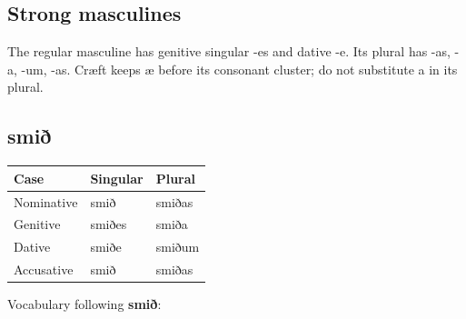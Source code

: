 \subsection*{Strong masculines}

The regular masculine has genitive singular -es and dative -e. Its plural has -as, -a, -um, -as. Cræft keeps æ before its consonant cluster; do not substitute a in its plural.

\subsection*{smið}

\par\begingroup
\fontsize{10.5}{13.2}\selectfont
\setlength{\LTleft}{0pt}\setlength{\LTright}{\fill}
\noindent
\begin{tabular}{@{}>{\raggedright\arraybackslash}p{39.46mm}>{\raggedright\arraybackslash}p{39.46mm}>{\raggedright\arraybackslash}p{39.46mm}@{}}
\toprule
\textbf{Case} & \textbf{Singular} & \textbf{Plural} \\
\midrule
Nominative & smið & smiðas \\
Genitive & smiðes & smiða \\
Dative & smiðe & smiðum \\
Accusative & smið & smiðas \\
\bottomrule
\end{tabular}
\par\endgroup

Vocabulary following \textbf{smið}:

